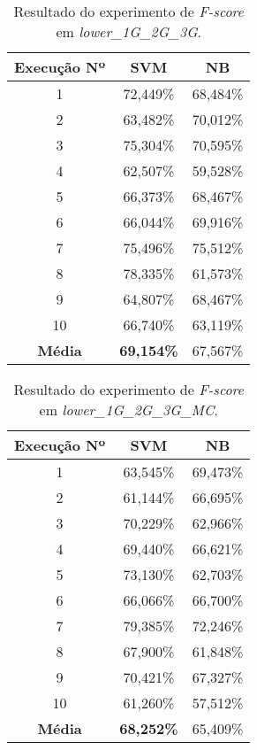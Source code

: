 \begin{table}[h]
    \centering
    \begin{tabular}{c c c}
        \hline
        {\bf Execução Nº} & {\bf SVM} & {\bf NB} \\
        \hline
        1 & 72,449\% & 68,484\% \\
        2 & 63,482\% & 70,012\% \\
        3 & 75,304\% & 70,595\% \\
        4 & 62,507\% & 59,528\% \\
        5 & 66,373\% & 68,467\% \\
        6 & 66,044\% & 69,916\% \\
        7 & 75,496\% & 75,512\% \\
        8 & 78,335\% & 61,573\% \\
        9 & 64,807\% & 68,467\% \\
        10 & 66,740\% & 63,119\% \\
        \hline
        {\bf Média} & {\bf 69,154\%} & 67,567\% \\
        \hline
    \end{tabular}
    \caption{Resultado do experimento de {\it F-score} em {\it lower\_1G\_2G\_3G}.}
    \label{tab:resultados-li-low-1g-2g-3g}
\end{table}

\begin{table}[h]
    \centering
    \begin{tabular}{c c c}
        \hline
        {\bf Execução Nº} & {\bf SVM} & {\bf NB} \\
        \hline
        1 & 63,545\% & 69,473\% \\
        2 & 61,144\% & 66,695\% \\
        3 & 70,229\% & 62,966\% \\
        4 & 69,440\% & 66,621\% \\
        5 & 73,130\% & 62,703\% \\
        6 & 66,066\% & 66,700\% \\
        7 & 79,385\% & 72,246\% \\
        8 & 67,900\% & 61,848\% \\
        9 & 70,421\% & 67,327\% \\
        10 & 61,260\% & 57,512\% \\
        \hline
        {\bf Média} & {\bf 68,252\%} & 65,409\% \\
        \hline
    \end{tabular}
    \caption{Resultado do experimento de {\it F-score} em {\it lower\_1G\_2G\_3G\_MC}.}
    \label{tab:resultados-li-low-1g-2g-3g-mc}
\end{table}